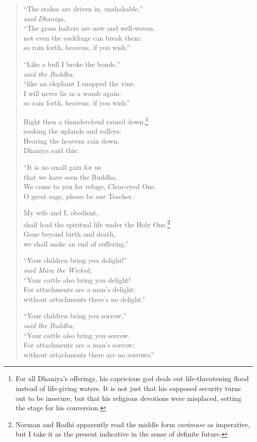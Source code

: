 \documentclass[12pt,openany]{book}%
\newcommand*{\scspeaker}[1]{\hspace{2em}\textit{#1}}
\begin{document}
\begin{verse}
“The stakes are driven in, unshakable,” \\
\scspeaker{said Dhaniya, }\\
“The grass halters are new and well-woven, \\
not even the sucklings can break them: \\
so rain forth, heavens, if you wish.” 

“Like a bull I broke the bonds,” \\
\scspeaker{said the Buddha, }\\
“like an elephant I snapped the vine. \\
I will never lie in a womb again: \\
so rain forth, heavens, if you wish.” 

Right then a thundercloud rained down,\footnote{For all Dhaniya’s offerings, his capricious god deals out life-threatening flood instead of life-giving waters. It is not just that his supposed security turns out to be insecure, but that his religious devotions were misplaced, setting the stage for his conversion. } \\
soaking the uplands and valleys. \\
Hearing the heavens rain down, \\
Dhaniya said this: 

“It is no small gain for us \\
that we have seen the Buddha. \\
We come to you for refuge, Clear-eyed One. \\
O great sage, please be our Teacher. 

My wife and I, obedient, \\
shall lead the spiritual life under the Holy One.\footnote{Norman and Bodhi apparently read the middle form \textit{\textsanskrit{carāmase}} as imperative, but I take it as the present indicative in the sense of definite future. } \\
Gone beyond birth and death, \\
we shall make an end of suffering.” 

“Your children bring you delight!” \\
\scspeaker{said \textsanskrit{Māra} the Wicked, }\\
“Your cattle also bring you delight! \\
For attachments are a man’s delight; \\
without attachments there’s no delight.” 

“Your children bring you sorrow,” \\
\scspeaker{said the Buddha, }\\
“Your cattle also bring you sorrow. \\
For attachments are a man’s sorrow; \\
without attachments there are no sorrows.” 

%
\end{verse}
\end{document}
